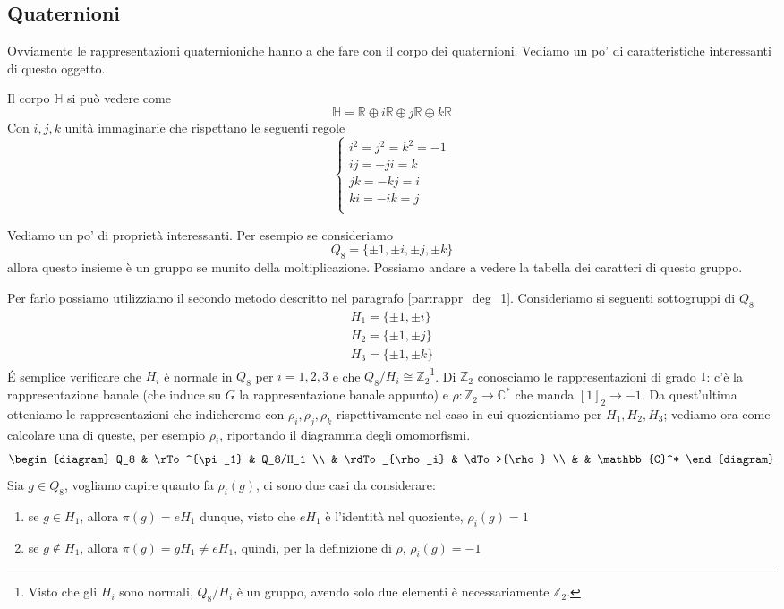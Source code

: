\documentclass[11pt]{article}
\theoremstyle{plain}
\theoremstyle{definition}
\theoremstyle{remark}
\newcommand{\C}{\mathbb{C}}
\newcommand{\R}{\mathbb{R}}
\newcommand{\Z}{\mathbb{Z}}
\newcommand{\HH}{\mathbb{H}}
\newcommand{\tridiag}[6]{
	  \begin{diagram}
	  #1 & \rTo^{#2}  & #3        \\
	     & \rdTo_{#6} & \dTo>{#4}   \\
	     &          & #5
	  \end{diagram}
}
\begin{document}
\subsection{Quaternioni}

Ovviamente le rappresentazioni quaternioniche hanno a che fare con il corpo dei quaternioni. Vediamo un po' di caratteristiche interessanti di questo oggetto.

Il corpo $\HH$ si può vedere come
\[\HH = \R \oplus i \R \oplus j \R \oplus k \R \]
Con $i,j,k$ unità immaginarie che rispettano le seguenti regole
\[ 
\begin{cases}
i^2 = j^2 = k^2 = -1 \\
ij = - ji = k \\
jk = -kj = i \\
ki = - ik = j \\
\end{cases}
\]

Vediamo un po' di proprietà interessanti. Per esempio se consideriamo 
\[ Q_8 =  \{\pm 1, \pm i, \pm j, \pm k \}\]
allora questo insieme è un gruppo se munito della moltiplicazione. Possiamo andare a vedere la tabella dei caratteri di questo gruppo. 

Per farlo possiamo utilizziamo il secondo metodo descritto nel paragrafo \eqref{par:rappr_deg_1}. Consideriamo si seguenti sottogruppi di $Q_8$
\begin{align*}
	H_1=\{ \pm1, \pm i \}\\
	H_2=\{ \pm1, \pm j \}\\
	H_3=\{ \pm1, \pm k \}
\end{align*}
\'E semplice verificare che $H_i$ è normale in $Q_8$ per $i=1,2,3$ e che $Q_8/H_i\cong \Z_2$\footnote{Visto che gli $H_i$ sono normali, $Q_8/H_i$ è un gruppo, avendo solo due elementi è necessariamente $\Z_2$.}. Di $\Z_2$ conosciamo le rappresentazioni di grado $1$: c'è la rappresentazione banale (che induce su $G$ la rappresentazione banale appunto) e $\rho:\Z_2\to \C^*$ che manda $[1]_2\to -1$. Da quest'ultima otteniamo le rappresentazioni che indicheremo con $\rho_i, \rho_j, \rho_k$ rispettivamente nel caso in cui quozientiamo per $H_1, H_2, H_3$; vediamo ora come calcolare una di queste, per esempio $\rho_i$, riportando il diagramma degli omomorfismi.
\[\tridiag {Q_8} {\pi_1} {Q_8/H_1} \rho {\C^*} {\rho_i}\]
Sia $g\in Q_8$, vogliamo capire quanto fa $\rho_i(g)$, ci sono due casi da considerare:
\begin{enumerate}
	\item se $g\in H_1$, allora $\pi(g) = eH_1$ dunque, visto che $eH_1$ è l'identità nel quoziente, $\rho_i(g)=1$
	\item se $g\not\in H_1$, allora $\pi(g) =gH_1\neq eH_1$, quindi, per la definizione di $\rho$, $\rho_i(g)=-1$
\end{enumerate}
\end{document}
